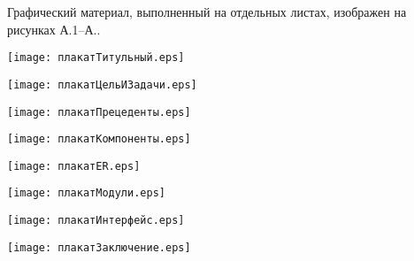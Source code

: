 
Графический материал, выполненный на отдельных листах,
изображен на рисунках А.1--А..
\setcounter{числоПлакатов}{0}

\renewcommand{\thefigure}{А.\arabic{figure}} %

\begin{landscape}

\begin{плакат}
    \texttt{[image: плакатТитульный.eps]}
    \label{pl1:плакатТитульный}      
\end{плакат}

\begin{плакат}
	\texttt{[image: плакатЦельИЗадачи.eps]}
	\label{pl2:плакатЦельИЗадачи}      
\end{плакат}

\begin{плакат}
	\texttt{[image: плакатПрецеденты.eps]}
	\label{pl3:плакатПрецеденты}      
\end{плакат}

\begin{плакат}
	\texttt{[image: плакатКомпоненты.eps]}
	\label{pl4:плакатКомпоненты}      
\end{плакат}

\begin{плакат}
	\texttt{[image: плакатER.eps]}
	\label{pl5:плакатER}      
\end{плакат}

\begin{плакат}
	\texttt{[image: плакатМодули.eps]}
	\label{pl6:плакатМодули}      
\end{плакат}

\begin{плакат}
	\texttt{[image: плакатИнтерфейс.eps]}
	\label{pl7:плакатИнтерфейс}      
\end{плакат}

\begin{плакат}
	\texttt{[image: плакатЗаключение.eps]}
	\label{pl7:плакатЗаключение}      
\end{плакат}

\end{landscape}

